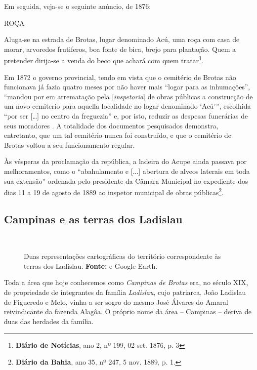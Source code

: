 Em seguida, veja-se o seguinte anúncio, de 1876:

\begin{citacao}
ROÇA

Aluga-se na estrada de Brotas, lugar denominado Acú, uma roça com casa de morar, arvoredos frutiferos, boa fonte de bica, brejo para plantação. Quem a pretender dirija-se a venda do beco que achará com quem tratar\footnote{\textbf{Diário de Notícias}, ano 2, nº 199, 02 set. 1876, p. 3}.
\end{citacao}

Em 1872 o governo provincial, tendo em vista que o cemitério de Brotas não funcionava já fazia quatro meses por não haver mais ``logar para as inhumações'', ``mandou por em arrematação pela [\textit{inspetoria}] de obras públicas a construcção de um novo cemiterio para aquella localidade no logar denominado `Acú''', escolhida ``por ser [\dots] no centro da freguezia'' e, por isto, reduzir as despesas funerárias de seus moradores \cite[p.~12]{bahia_1872}. A totalidade dos documentos pesquisados demonstra, entretanto, que um tal cemitério nunca foi construído, e que o cemitério de Brotas voltou a seu funcionamento regular.

Às vésperas da proclamação da república, a ladeira do Acupe ainda passava por melhoramentos, como o ``abahulamento e [...] abertura de alveos laterais em toda sua extensão'' ordenada pelo presidente da Câmara Municipal no expediente dos dias 11 a 19 de agosto de 1889 ao inspetor municipal de obras públicas\footnote{\textbf{Diário da Bahia}, ano 35, nº 247, 5 nov. 1889, p. 1.}.

\subsection{Campinas e as terras dos Ladislau}

\begin{figure}[!htp]
\centering
{}
\  %
\caption{Duas representações cartográficas do território correspondente às terras dos Ladislau. \textbf{Fonte:}  e Google Earth.}
\end{figure}

Toda a área que hoje conhecemos como \textit{Campinas de Brotas} era, no século XIX, de propriedade de integrantes da família \textit{Ladislau}, cujo patriarca, João Ladislau de Figueredo e Melo, vinha a ser sogro do mesmo José Álvares do Amaral reivindicante da fazenda Alagôa. O próprio nome da área -- Campinas -- deriva de duas das herdades da família.

